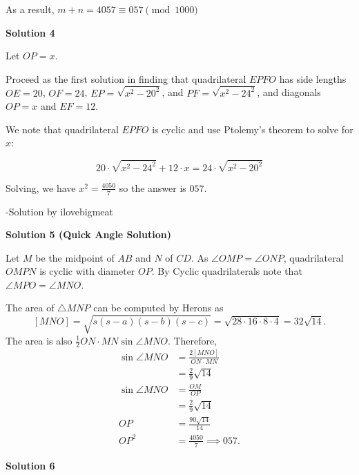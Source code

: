 \begin{enumerate}
 As a result, $m+n=4057\equiv \boxed{057}\pmod{1000}$




\textbf{Solution 4}

Let $OP=x$.

 Proceed as the first solution in finding that quadrilateral $EPFO$ has side lengths $OE=20$, $OF=24$, $EP=\sqrt{x^2-20^2}$, and $PF=\sqrt{x^2-24^2}$, and diagonals $OP=x$ and $EF=12$.

 We note that quadrilateral $EPFO$ is cyclic and use Ptolemy's theorem to solve for $x$:

 
 \[20\cdot \sqrt{x^2-24^2} + 12\cdot x = 24\cdot \sqrt{x^2-20^2}\]

 Solving, we have $x^2=\frac{4050}{7}$ so the answer is $\boxed{057}$.

 -Solution by ilovebigmeat

 



\textbf{Solution 5 (Quick Angle Solution)}

Let $M$ be the midpoint of $AB$ and $N$ of $CD$. As $\angle OMP = \angle ONP$, quadrilateral $OMPN$ is cyclic with diameter $OP$. By Cyclic quadrilaterals note that $\angle MPO = \angle MNO$.

 The area of $\triangle MNP$ can be computed by Herons as 
 \[[MNO] = \sqrt{s(s-a)(s-b)(s-c)} = \sqrt{28\cdot 16\cdot 8\cdot 4} = 32\sqrt{14}.\] The area is also $\frac{1}{2}ON \cdot MN \sin{\angle MNO}$. Therefore, 
 \begin{align*} \sin{\angle MNO} &= \frac{2[MNO]}{ON \cdot MN}  \\ &= \frac{2}{9}\sqrt{14} \\ \sin{\angle MNO} &= \frac{OM}{OP} \\ &= \frac{2}{9}\sqrt{14} \\ OP &= \frac{90\sqrt{14}}{14} \\ OP^2 &= \frac{4050}{7} \implies \boxed{057}. \end{align*}





\textbf{Solution 6}


\end{enumerate}

